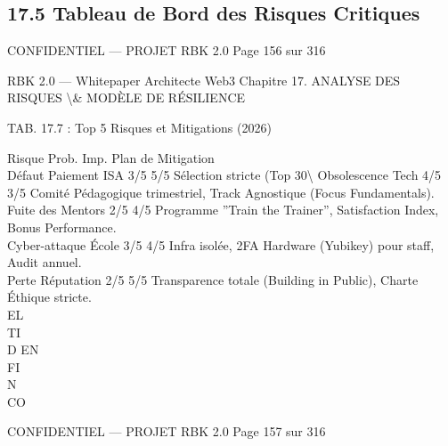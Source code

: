 \documentclass[12pt,landscape,a4paper]{article}
\newenvironment{confidential}
{\begin{tcolorbox}[
    colback=rbkred!5!white,
    colframe=rbkred!75!black,
    title=CONFIDENTIEL,
    fonttitle=\bfseries\color{white},
    coltitle=rbkred!75!black,
    breakable,
    enhanced,
    frame hidden,
    borderline west={2pt}{0pt}{rbkred!75!black}
]}
{\end{tcolorbox}}
\begin{document}
\subsection{17.5 Tableau de Bord des Risques Critiques}
\vspace{0.5em}
\vspace{0.5em}
\vspace{0.5em}
\vspace{0.5em}
\begin{confidential}CONFIDENTIEL — PROJET RBK 2.0                                Page 156 sur 316\end{confidential}
RBK 2.0 — Whitepaper Architecte Web3                                        Chapitre 17. ANALYSE DES RISQUES \textbackslash{}& MODÈLE DE RÉSILIENCE\\
\vspace{0.5em}
\vspace{0.5em}
\vspace{0.5em}
\vspace{0.5em}
\begin{center}\begin{tabular}TAB. 17.7 : Top 5 Risques et Mitigations (2026)\end{tabular}\end{center}
\vspace{0.5em}
\vspace{0.5em}
Risque              Prob. Imp. Plan de Mitigation\\
Défaut Paiement ISA 3/5 5/5 Sélection stricte (Top 30\textbackslash{}%
Obsolescence Tech    4/5 3/5 Comité Pédagogique trimestriel, Track Agnostique (Focus Fundamentals).\\
Fuite des Mentors    2/5 4/5 Programme ”Train the Trainer”, Satisfaction Index, Bonus Performance.\\
Cyber-attaque École 3/5 4/5 Infra isolée, 2FA Hardware (Yubikey) pour staff, Audit annuel.\\
Perte Réputation     2/5 5/5 Transparence totale (Building in Public), Charte Éthique stricte.\\
\vspace{0.5em}
\vspace{0.5em}
\vspace{0.5em}
\vspace{0.5em}
EL\\
TI\\
D    EN\\
FI\\
N\\
CO\\
\vspace{0.5em}
\vspace{0.5em}
\vspace{0.5em}
\vspace{0.5em}
\begin{confidential}CONFIDENTIEL — PROJET RBK 2.0                               Page 157 sur 316\end{confidential}
\end{document}
